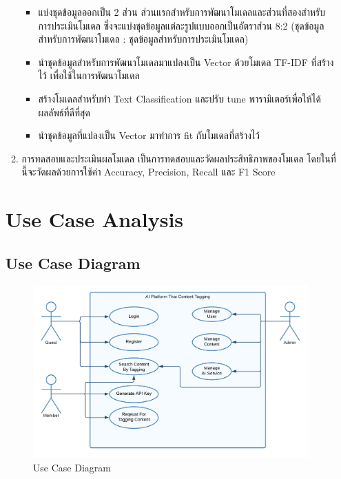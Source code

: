\documentclass[12pt,oneside,openright,a4paper]{cpe-thai-project}
\begin{document}
\begin{itemize}
\begin{enumerate}
          \begin{itemize}
            \item แบ่งชุดข้อมูลออกเป็น 2 ส่วน ส่วนแรกสำหรับการพัฒนาโมเดลและส่วนที่สองสำหรับการประเมินโมเดล 
            ซึ่งจะแบ่งชุดข้อมูลแต่ละรูปแบบออกเป็นอัตราส่วน 8:2 (ชุดข้อมูลสำหรับการพัฒนาโมเดล : ชุดข้อมูลสำหรับการประเมินโมเดล) 
            \item นำชุดข้อมูลสำหรับการพัฒนาโมเดลมาแปลงเป็น Vector ด้วยโมเดล TF-IDF ที่สร้างไว้ เพื่อใช้ในการพัฒนาโมเดล
            \item สร้างโมเดลสำหรับทำ Text Classification และปรับ tune พารามิเตอร์เพื่อให้ได้ผลลัพธ์ที่ดีที่สุด
            \item นำชุดข้อมูลที่แปลงเป็น Vector มาทำการ fit กับโมเดลที่สร้างไว้
          \end{itemize}
    \item การทดสอบและประเมินผลโมเดล 
          \newline\hspace*{1cm}เป็นการทดสอบและวัดผลประสิทธิภาพของโมเดล โดยในที่นี้จะวัดผลด้วยการใช้ค่า Accuracy, Precision, Recall และ F1 Score
  \end{enumerate}

\section{Use Case Analysis}
\subsection{Use Case Diagram}
\begin{figure}[!ht]\centering
  \includegraphics[width=13cm]{./img/usecase.png}
  \caption{Use Case Diagram}\label{fig:usecase} 
\end{figure}


\end{itemize}
\end{document}
